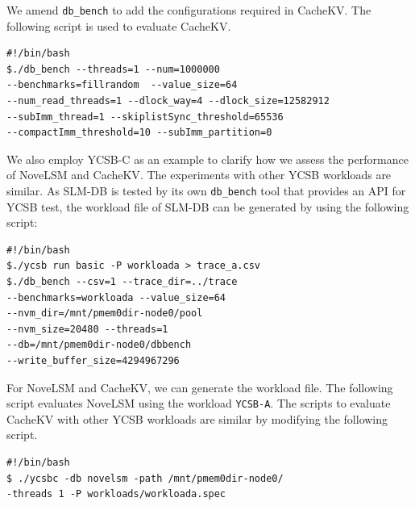 \documentclass[sigconf, nonacm]{acmart}
\newcommand\sysname{\textsf{CacheKV}\xspace}
\renewcommand{\paragraph}[1]{\smallskip\noindent {\bf #1}}
\begin{document}
We amend {\tt db\_bench} to add the configurations required 
in \sysname. The following script is used to evaluate \sysname. 
\begin{verbatim}
#!/bin/bash
$./db_bench --threads=1 --num=1000000 
--benchmarks=fillrandom  --value_size=64 
--num_read_threads=1 --dlock_way=4 --dlock_size=12582912 
--subImm_thread=1 --skiplistSync_threshold=65536 
--compactImm_threshold=10 --subImm_partition=0
\end{verbatim} 

\paragraph{Experiments with YCSB:} 
We also employ YCSB-C as an example to clarify how we assess
the performance of NoveLSM and \sysname. The experiments with
other YCSB workloads are similar.
As SLM-DB is tested by its own {\tt db\_bench} tool that provides an API for YCSB
test, the workload file of SLM-DB can be generated by using the following script:
\begin{verbatim}
#!/bin/bash
$./ycsb run basic -P workloada > trace_a.csv
$./db_bench --csv=1 --trace_dir=../trace
--benchmarks=workloada --value_size=64
--nvm_dir=/mnt/pmem0dir-node0/pool
--nvm_size=20480 --threads=1
--db=/mnt/pmem0dir-node0/dbbench
--write_buffer_size=4294967296
\end{verbatim}


For NoveLSM and \sysname, we can generate the workload file. 
The following script evaluates NoveLSM using the workload 
{\tt YCSB-A}. The scripts to evaluate \sysname with other 
YCSB workloads are similar by modifying the following script. 
\begin{verbatim}
#!/bin/bash
$ ./ycsbc -db novelsm -path /mnt/pmem0dir-node0/
-threads 1 -P workloads/workloada.spec
\end{verbatim}








\end{document}
